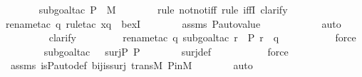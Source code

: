 \begin{isabellebody}
\ \ \ \ \ \ \isamarkupfalse%
{\isacharparenleft}{\kern0pt}subgoal{\isacharunderscore}{\kern0pt}tac\ {\isachardoublequoteopen}P\ {\isasymsubseteq}\ M{\isachardoublequoteclose}{\isacharparenright}{\kern0pt}\isanewline
\ \ \ \ \ \ \ \isamarkupfalse%
{\isacharparenleft}{\kern0pt}rule\ notnot{\isacharunderscore}{\kern0pt}iff{\isacharcomma}{\kern0pt}\ rule\ iffI{\isacharcomma}{\kern0pt}\ clarify{\isacharparenright}{\kern0pt}\isanewline
\ \ \ \ \ \ \ \ \isamarkupfalse%
{\isacharparenleft}{\kern0pt}rename{\isacharunderscore}{\kern0pt}tac\ q{\isacharcomma}{\kern0pt}\ rule{\isacharunderscore}{\kern0pt}tac\ x{\isacharequal}{\kern0pt}{\isachardoublequoteopen}{\isasympi}{\isacharbackquote}{\kern0pt}q{\isachardoublequoteclose}\ \ bexI{\isacharparenright}{\kern0pt}\isanewline
\ \ \ \ \ \ \isamarkupfalse%
\ assms\ P{\isacharunderscore}{\kern0pt}auto{\isacharunderscore}{\kern0pt}value\ \isanewline
\ \ \ \ \ \ \ \ \ \isamarkupfalse%
\ auto{\isacharbrackleft}{\kern0pt}{}{\isacharbrackright}{\kern0pt}\isanewline
\ \ \ \ \ \ \ \isamarkupfalse%
\ clarify\ \isanewline
\ \ \ \ \ \ \ \isamarkupfalse%
{\isacharparenleft}{\kern0pt}rename{\isacharunderscore}{\kern0pt}tac\ q{\isacharcomma}{\kern0pt}\ subgoal{\isacharunderscore}{\kern0pt}tac\ {\isachardoublequoteopen}{\isasymexists}r\ {\isasymin}\ P{\isachardot}{\kern0pt}\ {\isasympi}{\isacharbackquote}{\kern0pt}r\ {\isacharequal}{\kern0pt}\ q{\isachardoublequoteclose}{\isacharparenright}{\kern0pt}\ \isanewline
\ \ \ \ \ \ \ \ \isamarkupfalse%
\ force\isanewline
\ \ \ \ \ \ \ \isamarkupfalse%
{\isacharparenleft}{\kern0pt}subgoal{\isacharunderscore}{\kern0pt}tac\ {\isachardoublequoteopen}{\isasympi}\ {\isasymin}\ surj{\isacharparenleft}{\kern0pt}P{\isacharcomma}{\kern0pt}\ P{\isacharparenright}{\kern0pt}{\isachardoublequoteclose}{\isacharparenright}{\kern0pt}\isanewline
\ \ \ \ \ \ \isamarkupfalse%
\ surj{\isacharunderscore}{\kern0pt}def\ \isanewline
\ \ \ \ \ \ \ \ \isamarkupfalse%
\ force\ \isanewline
\ \ \ \ \ \ \isamarkupfalse%
\ assms\ is{\isacharunderscore}{\kern0pt}P{\isacharunderscore}{\kern0pt}auto{\isacharunderscore}{\kern0pt}def\ bij{\isacharunderscore}{\kern0pt}is{\isacharunderscore}{\kern0pt}surj\ transM\ P{\isacharunderscore}{\kern0pt}in{\isacharunderscore}{\kern0pt}M\isanewline
\ \ \ \ \ \ \isamarkupfalse%
\ auto\isanewline
\ \ \ \ \isamarkupfalse%
\ \isamarkupfalse%

\end{isabellebody}
